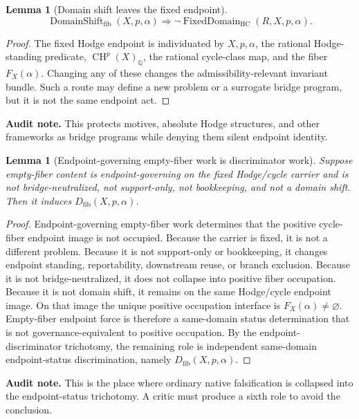 \documentclass[11pt]{article}
\newtheorem{lemma}[theorem]{Lemma}
\newcommand{\QQ}{\mathbb{Q}}
\newcommand{\CH}{\operatorname{CH}}
\newcommand{\HC}{\operatorname{HC}}
\newcommand{\FixedDomain}{\operatorname{FixedDomain}}
\begin{document}
\begin{lemma}[Domain shift leaves the fixed endpoint]\label{lem:domain-shift-not-fixed}
\[
\operatorname{DomainShift}_{\mathrm{fib}}(X,p,\alpha)
\Rightarrow \neg\FixedDomain_{\HC}(R,X,p,\alpha).
\]
\end{lemma}
\begin{proof}
The fixed Hodge endpoint is individuated by $X,p,\alpha$, the rational Hodge-standing predicate, $\CH^p(X)_\QQ$, the rational cycle-class map, and the fiber $F_X(\alpha)$.  Changing any of these changes the admissibility-relevant invariant bundle.  Such a route may define a new problem or a surrogate bridge program, but it is not the same endpoint act.
\end{proof}
\par\noindent\textbf{Audit note.} This protects motives, absolute Hodge structures, and other frameworks as bridge programs while denying them silent endpoint identity.

\begin{lemma}[Endpoint-governing empty-fiber work is discriminator work]\label{lem:endpoint-governing-empty-fiber-discriminator}
Suppose empty-fiber content is endpoint-governing on the fixed Hodge/cycle carrier and is not bridge-neutralized, not support-only, not bookkeeping, and not a domain shift.  Then it induces $D_{\mathrm{fib}}(X,p,\alpha)$.
\end{lemma}
\begin{proof}
Endpoint-governing empty-fiber work determines that the positive cycle-fiber endpoint image is not occupied.  Because the carrier is fixed, it is not a different problem.  Because it is not support-only or bookkeeping, it changes endpoint standing, reportability, downstream reuse, or branch exclusion.  Because it is not bridge-neutralized, it does not collapse into positive fiber occupation.  Because it is not domain shift, it remains on the same Hodge/cycle endpoint image.  On that image the unique positive occupation interface is $F_X(\alpha)\neq\varnothing$.  Empty-fiber endpoint force is therefore a same-domain status determination that is not governance-equivalent to positive occupation.  By the endpoint-discriminator trichotomy, the remaining role is independent same-domain endpoint-status discrimination, namely $D_{\mathrm{fib}}(X,p,\alpha)$.
\end{proof}
\par\noindent\textbf{Audit note.} This is the place where ordinary native falsification is collapsed into the endpoint-status trichotomy.  A critic must produce a sixth role to avoid the conclusion.
\end{document}
